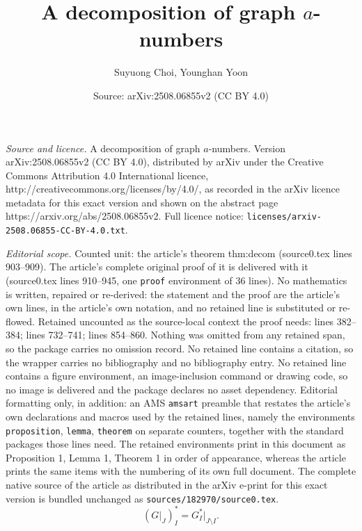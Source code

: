 \documentclass[10pt,a4paper]{amsart}
\title{A decomposition of graph $a$-numbers}
\author{Suyuong Choi, Younghan Yoon}
\date{Source: arXiv:2508.06855v2 (CC BY 4.0)}
\begin{document}
\maketitle

\noindent\emph{Source and licence.} A decomposition of graph $a$-numbers. Version arXiv:2508.06855v2 (CC BY 4.0), distributed by arXiv under the Creative Commons Attribution 4.0 International licence, http://creativecommons.org/licenses/by/4.0/, as recorded in the arXiv licence metadata for this exact version and shown on the abstract page https://arxiv.org/abs/2508.06855v2. Full licence notice: \texttt{licenses/arxiv-2508.06855-CC-BY-4.0.txt}.\par\smallskip

\noindent\textit{Editorial scope.} Counted unit: the article's theorem thm:decom (source0.tex lines 903--909). The article's complete original proof of it is delivered with it (source0.tex lines 910--945, one \texttt{proof} environment of 36 lines). No mathematics is written, repaired or re-derived: the statement and the proof are the article's own lines, in the article's own notation, and no retained line is substituted or re-flowed.  Retained uncounted as the source-local context the proof needs: lines 382--384; lines 732--741; lines 854--860.  Nothing was omitted from any retained span, so the package carries no omission record.  No retained line contains a citation, so the wrapper carries no bibliography and no bibliography entry.  No retained line contains a figure environment, an image-inclusion command or drawing code, so no image is delivered and the package declares no asset dependency.  Editorial formatting only, in addition: an AMS \texttt{amsart} preamble that restates the article's own declarations and macros used by the retained lines, namely the environments \texttt{proposition}, \texttt{lemma}, \texttt{theorem} on separate counters, together with the standard packages those lines need.  The retained environments print in this document as Proposition 1, Lemma 1, Theorem 1 in order of appearance, whereas the article prints the same items with the numbering of its own full document.  The complete native source of the article as distributed in the arXiv e-print for this exact version is bundled unchanged as \texttt{sources/182970/source0.tex}.
\begin{equation}\label{eq:inter}
  (G\vert_{J})^\ast_{I} = G^\ast_{I}\vert_{J \setminus I}.
\end{equation}
\end{document}
